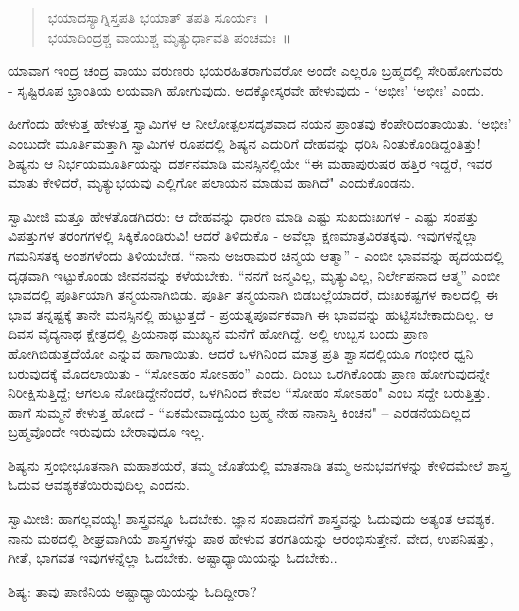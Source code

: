 \begin{verse}
ಭಯಾದಸ್ಯಾಗ್ನಿಸ್ತಪತಿ ಭಯಾತ್ ತಪತಿ ಸೂರ್ಯಃ~।\\ಭಯಾದಿಂದ್ರಶ್ಚ ವಾಯುಶ್ಚ ಮೃತ್ಯುರ್ಧಾವತಿ ಪಂಚಮಃ~॥
\end{verse}

ಯಾವಾಗ ಇಂದ್ರ ಚಂದ್ರ ವಾಯು ವರುಣರು ಭಯರಹಿತರಾಗುವರೋ ಅಂದೇ ಎಲ್ಲರೂ ಬ್ರಹ್ಮದಲ್ಲಿ ಸೇರಿಹೋಗುವರು - ಸೃಷ್ಟಿರೂಪ ಭ್ರಾಂತಿಯ ಲಯವಾಗಿ ಹೋಗುವುದು. ಅದಕ್ಕೋಸ್ಕರವೇ ಹೇಳುವುದು - ‘ಅಭೀಃ’ ‘ಅಭೀಃ’ ಎಂದು.

ಹೀಗೆಂದು ಹೇಳುತ್ತ ಹೇಳುತ್ತ ಸ್ವಾಮಿಗಳ ಆ ನೀಲೋತ್ಪಲಸದೃಶವಾದ ನಯನ ಪ್ರಾಂತವು ಕೆಂಪೇರಿದಂತಾಯಿತು. ‘ಅಭೀಃ’ ಎಂಬುದೇ ಮೂರ್ತಿಮತ್ತಾಗಿ ಸ್ವಾಮಿಗಳ ರೂಪದಲ್ಲಿ ಶಿಷ್ಯನ ಎದುರಿಗೆ ದೇಹವನ್ನು ಧರಿಸಿ ನಿಂತುಕೊಂಡಿದ್ದಂತಿತ್ತು! ಶಿಷ್ಯನು ಆ ನಿರ್ಭಯಮೂರ್ತಿಯನ್ನು ದರ್ಶನಮಾಡಿ ಮನಸ್ಸಿನಲ್ಲಿಯೇ “ಈ ಮಹಾಪುರುಷರ ಹತ್ತಿರ ಇದ್ದರೆ, ಇವರ ಮಾತು ಕೇಳಿದರೆ, ಮೃತ್ಯುಭಯವು ಎಲ್ಲಿಗೋ ಪಲಾಯನ ಮಾಡುವ ಹಾಗಿದೆ" ಎಂದುಕೊಂಡನು.

ಸ್ವಾಮೀಜಿ ಮತ್ತೂ ಹೇಳತೊಡಗಿದರು: ಆ ದೇಹವನ್ನು ಧಾರಣ ಮಾಡಿ ಎಷ್ಟು ಸುಖದುಃಖಗಳ - ಎಷ್ಟು ಸಂಪತ್ತು ವಿಪತ್ತುಗಳ ತರಂಗಗಳಲ್ಲಿ ಸಿಕ್ಕಿಕೊಂಡಿರುವಿ! ಆದರೆ ತಿಳಿದುಕೊ - ಅವೆಲ್ಲಾ ಕ್ಷಣಮಾತ್ರವಿರತಕ್ಕವು. ಇವುಗಳನ್ನೆಲ್ಲಾ ಗಮನಿಸತಕ್ಕ ಅಂಶಗಳೆಂದು ತಿಳಿಯಬೇಡ. “ನಾನು ಅಜರಾಮರ ಚಿನ್ಮಯ ಆತ್ಮಾ” - ಎಂಬೀ ಭಾವವನ್ನು ಹೃದಯದಲ್ಲಿ ದೃಢವಾಗಿ ಇಟ್ಟುಕೊಂಡು ಜೀವನವನ್ನು ಕಳೆಯಬೇಕು. “ನನಗೆ ಜನ್ಮವಿಲ್ಲ, ಮೃತ್ಯುವಿಲ್ಲ, ನಿರ್ಲೇಪನಾದ ಆತ್ಮ” ಎಂಬೀ ಭಾವದಲ್ಲಿ ಪೂರ್ತಿಯಾಗಿ ತನ್ಮಯನಾಗಿಬಿಡು. ಪೂರ್ತಿ ತನ್ಮಯನಾಗಿ ಬಿಡಬಲ್ಲೆಯಾದರೆ, ದುಃಖಕಷ್ಟಗಳ ಕಾಲದಲ್ಲಿ ಈ ಭಾವ ತನ್ನಷ್ಟಕ್ಕೆ ತಾನೇ ಮನಸ್ಸಿನಲ್ಲಿ ಹುಟ್ಟುತ್ತದೆ - ಪ್ರಯತ್ನಪೂರ್ವಕವಾಗಿ ಈ ಭಾವವನ್ನು ಹುಟ್ಟಿಸಬೇಕಾದುದಿಲ್ಲ. ಆ ದಿವಸ ವೈದ್ಯನಾಥ ಕ್ಷೇತ್ರದಲ್ಲಿ ಪ್ರಿಯನಾಥ ಮುಖ್ಯನ ಮನೆಗೆ ಹೋಗಿದ್ದೆ. ಅಲ್ಲಿ ಉಬ್ಬಸ ಬಂದು ಪ್ರಾಣ ಹೋಗಿಬಿಡುತ್ತದೆಯೋ ಎನ್ನುವ ಹಾಗಾಯಿತು. ಆದರೆ ಒಳಗಿನಿಂದ ಮಾತ್ರ ಪ್ರತಿ ಶ್ವಾಸದಲ್ಲಿಯೂ ಗಂಭೀರ ಧ್ವನಿ ಬರುವುದಕ್ಕೆ ಮೊದಲಾಯಿತು - “ಸೋಽಹಂ ಸೋಽಹಂ” ಎಂದು. ದಿಂಬು ಒರಗಿಕೊಂಡು ಪ್ರಾಣ ಹೋಗುವುದನ್ನೇ ನಿರೀಕ್ಷಿಸುತ್ತಿದ್ದೆ; ಆಗಲೂ ನೋಡಿದ್ದೇನೆಂದರೆ, ಒಳಗಿನಿಂದ ಕೇವಲ “ಸೋಹಂ ಸೋಽಹಂ" ಎಂಬ ಸದ್ದೇ ಬರುತ್ತಿತ್ತು. ಹಾಗೆ ಸುಮ್ಮನೆ ಕೇಳುತ್ತ ಹೋದೆ - “ಏಕಮೇವಾದ್ವಯಂ ಬ್ರಹ್ಮ ನೇಹ ನಾನಾಸ್ತಿ ಕಿಂಚನ" – ಎರಡನೆಯದಿಲ್ಲದ ಬ್ರಹ್ಮವೊಂದೇ ಇರುವುದು ಬೇರಾವುದೂ ಇಲ್ಲ.

ಶಿಷ್ಯನು ಸ್ತಂಭೀಭೂತನಾಗಿ ಮಹಾಶಯರೆ, ತಮ್ಮ ಜೊತೆಯಲ್ಲಿ ಮಾತನಾಡಿ ತಮ್ಮ ಅನುಭವಗಳನ್ನು ಕೇಳಿದಮೇಲೆ ಶಾಸ್ತ್ರ ಓದುವ ಆವಶ್ಯಕತೆಯಿರುವುದಿಲ್ಲ ಎಂದನು.

ಸ್ವಾಮೀಜಿ: ಹಾಗಲ್ಲವಯ್ಯ! ಶಾಸ್ತ್ರವನ್ನೂ ಓದಬೇಕು. ಜ್ಞಾನ ಸಂಪಾದನೆಗೆ ಶಾಸ್ತ್ರವನ್ನು ಓದುವುದು ಅತ್ಯಂತ ಆವಶ್ಯಕ. ನಾನು ಮಠದಲ್ಲಿ ಶೀಘ್ರವಾಗಿಯೆ ಶಾಸ್ತ್ರಗಳನ್ನು ಪಾಠ ಹೇಳುವ ತರಗತಿಯನ್ನು ಆರಂಭಿಸುತ್ತೇನೆ. ವೇದ, ಉಪನಿಷತ್ತು, ಗೀತೆ, ಭಾಗವತ ಇವುಗಳನ್ನೆಲ್ಲಾ ಓದಬೇಕು. ಅಷ್ಟಾಧ್ಯಾಯಿಯನ್ನು ಓದಬೇಕು..

ಶಿಷ್ಯ: ತಾವು ಪಾಣಿನಿಯ ಅಷ್ಟಾಧ್ಯಾಯಿಯನ್ನು ಓದಿದ್ದೀರಾ?

